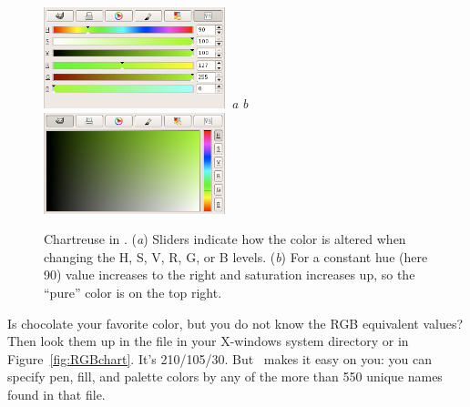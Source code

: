 \begin{figure}[b]
   \includegraphics[width=0.47\textwidth,bb=0 0 375 209]{fig/gimp-sliders.png}~\emph{a}\hfill
   \emph{b}~\includegraphics[width=0.47\textwidth,bb=0 0 375 209]{fig/gimp-panel.png}
   \caption{Chartreuse in . (\emph{a}) Sliders indicate how the color is altered when changing the H, S, V, R, G, or B levels. (\emph{b}) For a constant hue (here 90\DS) value increases to the right and saturation increases up, so the ``pure'' color is on the top right.}
   \label{fig:gimp}
\end{figure}

Is chocolate your favorite color, but you do not know the RGB equivalent values? Then look them up in the  file in your X-windows system directory or in Figure~\ref{fig:RGBchart}. It's 210/105/30. But \GMT\ makes it easy on you: you can specify pen, fill, and palette colors by any of the more than 550 unique names found in that file.

